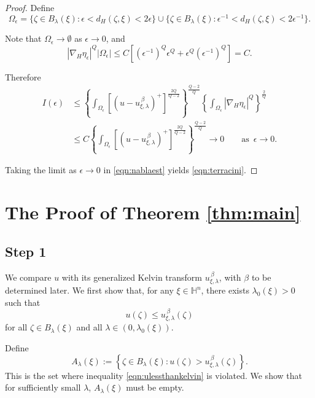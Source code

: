 \documentclass[reqno]{amsart}
\theoremstyle{definition}
\theoremstyle{remark}
\numberwithin{equation}{section}
\begin{document}
\begin{proof}
Define
\[
\Omega_{\epsilon} = \{\zeta \in B_{\lambda}(\xi) : \epsilon < d_{\! H}(\zeta,\xi) < 2\epsilon\}
\cup \{\zeta \in B_{\lambda}(\xi) : \epsilon^{-1} < d_{\! H}(\zeta,\xi) < 2\epsilon^{-1}\}.
\] 

Note that $\Omega_{\epsilon} \to \emptyset$ as $\epsilon \to 0$, and
\[
\left| \nabla_{\! H} \eta_{\epsilon} \right|^Q |\Omega_{\epsilon}| \leq C\left[(\epsilon^{-1})^Q \epsilon^Q + \epsilon^Q (\epsilon^{-1})^Q\right] = C.
\]

Therefore
\begin{align*}
I(\epsilon) &\leq \left\{ \int_{\Omega_{\epsilon}} \left[ (u - u_{\xi,\lambda}^{\,\beta})^{+} \right]^{\frac{2Q}{Q-2}} \right\}^{\frac{Q-2}{Q}} 
\left\{ \int_{\Omega_{\epsilon}} \left| \nabla_{\! H} \eta_{\epsilon} \right|^Q \right\}^{\frac{2}{Q}} \\
&\leq C \left\{ \int_{\Omega_{\epsilon}} \left[ (u - u_{\xi,\lambda}^{\,\beta})^{+} \right]^{\frac{2Q}{Q-2}} \right\}^{\frac{Q-2}{Q}} \to 0 \qquad \text{as }\, \epsilon\to 0.
\end{align*}

Taking the limit as $\epsilon \to 0$ in \eqref{eqn:nablaest} yields \eqref{eqn:terracini}.
\end{proof}

\section{The Proof of Theorem \ref{thm:main}}
\label{sec:PfofMainThm}


\subsection*{Step 1}
We compare $u$ with its generalized Kelvin transform $u_{\xi,\lambda}^{\,\beta}$, with $\beta$ 
to be determined later.
We first show that, for any $\xi \in \mathbb{H}^{n}$, there exists $\lambda_{0}(\xi)>0$ such that
\begin{equation}\label{eqn:ulessthankelvin}
u(\zeta) \leq u_{\xi,\lambda}^{\,\beta}(\zeta)
\end{equation}
for all $\zeta \in B_{\lambda}(\xi)$ and all  $\lambda \in\left(0, \lambda_{0}(\xi)\right)$.

Define
\[
A_{\lambda}(\xi):=\left\{\zeta \in B_{\lambda}(\xi): u(\zeta) > u_{\xi,\lambda}^{\,\beta}(\zeta)\right\}.
\]
This is the set where inequality \eqref{eqn:ulessthankelvin} is violated. We show that
for sufficiently small $\lambda$,  $A_{\lambda}(\xi)$ must be empty. 
\end{document}
